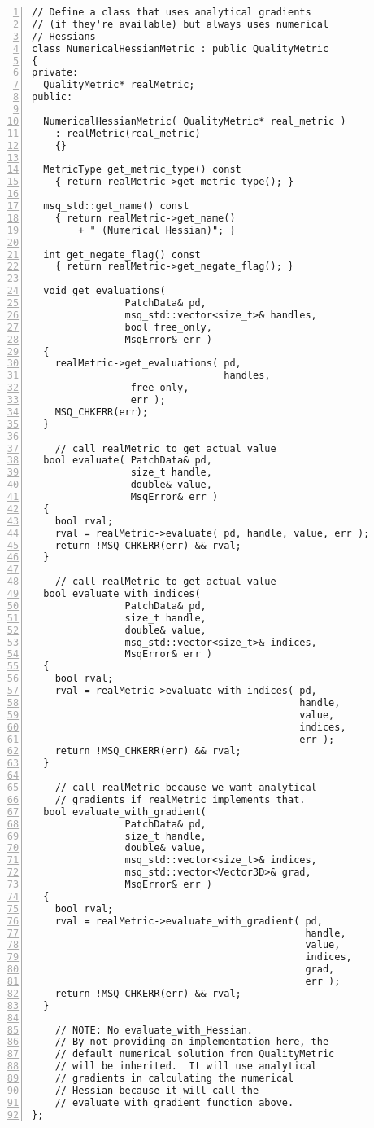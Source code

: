 \documentclass{article}
\begin{document}
\begin{lstlisting}[numbers=left,caption={Numerical \texttt{QualityMetric} Wrapper},label={lst:numerical}]
// Define a class that uses analytical gradients
// (if they're available) but always uses numerical
// Hessians
class NumericalHessianMetric : public QualityMetric
{
private:
  QualityMetric* realMetric;
public:

  NumericalHessianMetric( QualityMetric* real_metric )
    : realMetric(real_metric)
    {}

  MetricType get_metric_type() const
    { return realMetric->get_metric_type(); }

  msq_std::get_name() const
    { return realMetric->get_name()
        + " (Numerical Hessian)"; }

  int get_negate_flag() const
    { return realMetric->get_negate_flag(); }

  void get_evaluations(
                PatchData& pd,
                msq_std::vector<size_t>& handles,
                bool free_only,
                MsqError& err )
  {
    realMetric->get_evaluations( pd,
                                 handles,
				 free_only,
				 err );
    MSQ_CHKERR(err);
  }

    // call realMetric to get actual value
  bool evaluate( PatchData& pd,
                 size_t handle,
                 double& value,
                 MsqError& err )
  {
    bool rval;
    rval = realMetric->evaluate( pd, handle, value, err );
    return !MSQ_CHKERR(err) && rval;
  }

    // call realMetric to get actual value
  bool evaluate_with_indices(
                PatchData& pd,
                size_t handle,
                double& value,
                msq_std::vector<size_t>& indices,
                MsqError& err )
  {
    bool rval;
    rval = realMetric->evaluate_with_indices( pd,
                                              handle,
                                              value,
                                              indices,
                                              err );
    return !MSQ_CHKERR(err) && rval;
  }

    // call realMetric because we want analytical
    // gradients if realMetric implements that.
  bool evaluate_with_gradient(
                PatchData& pd,
                size_t handle,
                double& value,
                msq_std::vector<size_t>& indices,
                msq_std::vector<Vector3D>& grad,
                MsqError& err )
  {
    bool rval;
    rval = realMetric->evaluate_with_gradient( pd,
                                               handle,
                                               value,
                                               indices,
                                               grad,
                                               err );
    return !MSQ_CHKERR(err) && rval;
  }

    // NOTE: No evaluate_with_Hessian.
    // By not providing an implementation here, the
    // default numerical solution from QualityMetric
    // will be inherited.  It will use analytical
    // gradients in calculating the numerical
    // Hessian because it will call the
    // evaluate_with_gradient function above.
};
\end{lstlisting}
\end{document}
